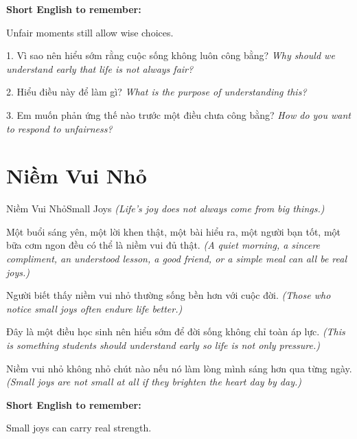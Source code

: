 \begin{ghinhoanh}
\textbf{Short English to remember:}

Unfair moments still allow wise choices.

\end{ghinhoanh}

\begin{tuhocnhanh}
1. Vì sao nên hiểu sớm rằng cuộc sống không luôn công bằng? \textit{Why should we understand early that life is not always fair?}

2. Hiểu điều này để làm gì? \textit{What is the purpose of understanding this?}

3. Em muốn phản ứng thế nào trước một điều chưa công bằng? \textit{How do you want to respond to unfairness?}
\end{tuhocnhanh}
\ngancach

\section{Niềm Vui Nhỏ}
\begin{truyen}{Niềm Vui Nhỏ}{Small Joys}
\textit{(Life's joy does not always come from big things.)}

Một buổi sáng yên, một lời khen thật, một bài hiểu ra, một người bạn tốt, một bữa cơm ngon đều có thể là niềm vui đủ thật.
\textit{(A quiet morning, a sincere compliment, an understood lesson, a good friend, or a simple meal can all be real joys.)}

Người biết thấy niềm vui nhỏ thường sống bền hơn với cuộc đời.
\textit{(Those who notice small joys often endure life better.)}

Đây là một điều học sinh nên hiểu sớm để đời sống không chỉ toàn áp lực.
\textit{(This is something students should understand early so life is not only pressure.)}
\end{truyen}

\begin{baihoc}
Niềm vui nhỏ không nhỏ chút nào nếu nó làm lòng mình sáng hơn qua từng ngày.
\textit{(Small joys are not small at all if they brighten the heart day by day.)}
\end{baihoc}

\begin{ghinhoanh}
\textbf{Short English to remember:}

Small joys can carry real strength.

\end{ghinhoanh}

